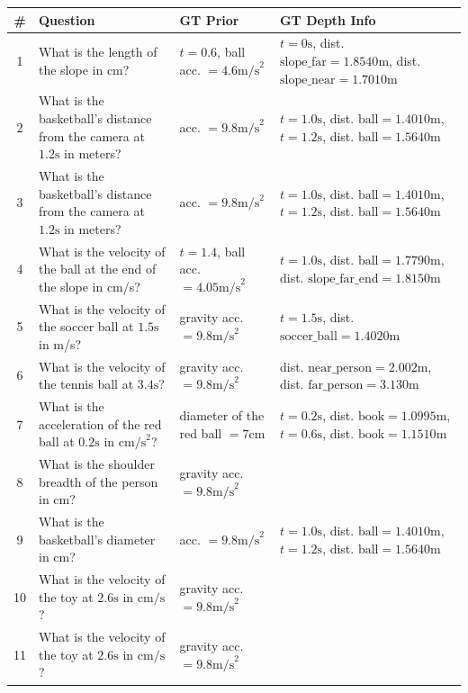 \begin{tabular}{@{} c L{7.5cm} L{4.0cm} L{3.0cm} @{}}
\toprule
\textbf{\#} & \textbf{Question} & \textbf{GT Prior} & \textbf{GT Depth Info} \\
 & What is the length of the slope in cm? & $t=0.6$, ball acc. $= 4.6\text{m/s}^2$ & $t=0\text{s}$, dist. $\text{slope\_far} = 1.8540\text{m}$, dist. $\text{slope\_near} = 1.7010\text{m}$ \\
2 & What is the basketball's distance from the camera at $1.2\text{s}$ in meters? & acc. $= 9.8 \text{m/s}^2$ & $t=1.0\text{s}$, dist. $\text{ball} = 1.4010\text{m}$, $t=1.2\text{s}$, dist. $\text{ball} = 1.5640\text{m}$ \\
3 & What is the basketball's distance from the camera at $1.2\text{s}$ in meters? & acc. $= 9.8 \text{m/s}^2$ & $t=1.0\text{s}$, dist. $\text{ball} = 1.4010\text{m}$, $t=1.2\text{s}$, dist. $\text{ball} = 1.5640\text{m}$ \\
4 & What is the velocity of the ball at the end of the slope in cm/s? & $t=1.4$, ball acc. $= 4.05\text{m/s}^2$ & $t=1.0\text{s}$, dist. $\text{ball} = 1.7790\text{m}$, dist. $\text{slope\_far\_end} = 1.8150\text{m}$ \\
5 & What is the velocity of the soccer ball at $1.5\text{s}$ in m/s? & gravity acc. $= 9.8\text{m/s}^2$ & $t=1.5\text{s}$, dist. $\text{soccer\_ball} = 1.4020\text{m}$ \\
6 & What is the velocity of the tennis ball at $3.4\text{s}$? & gravity acc. $= 9.8\text{m/s}^2$ & dist. $\text{near\_person} = 2.002\text{m}$, dist. $\text{far\_person} = 3.130\text{m}$ \\
7 & What is the acceleration of the red ball at $0.2\text{s}$ in $\text{cm/s}^2$? & diameter of the red ball $= 7\text{cm}$ & $t=0.2\text{s}$, dist. $\text{book} = 1.0995\text{m}$, $t=0.6\text{s}$, dist. $\text{book} = 1.1510\text{m}$ \\
8 & What is the shoulder breadth of the person in cm? & gravity acc. $= 9.8\text{m/s}^2$ & \\
9 & What is the basketball's diameter in cm? & acc. $= 9.8 \text{m/s}^2$ & $t=1.0\text{s}$, dist. $\text{ball} = 1.4010\text{m}$, $t=1.2\text{s}$, dist. $\text{ball} = 1.5640\text{m}$ \\
10 & What is the velocity of the toy at $2.6\text{s}$ in $\text{cm/s}$? & gravity acc. $= 9.8\text{m/s}^2$ & \\
11 & What is the velocity of the toy at $2.6\text{s}$ in $\text{cm/s}$? & gravity acc. $= 9.8\text{m/s}^2$ & \\

\end{tabular}
